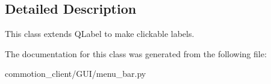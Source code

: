 \subsection{Detailed Description}
\begin{DoxyVerb}This class extends QLabel to make clickable labels.
\end{DoxyVerb}
 

The documentation for this class was generated from the following file\-:\begin{DoxyCompactItemize}
\item 
commotion\-\_\-client/\-G\-U\-I/menu\-\_\-bar.\-py\end{DoxyCompactItemize}
